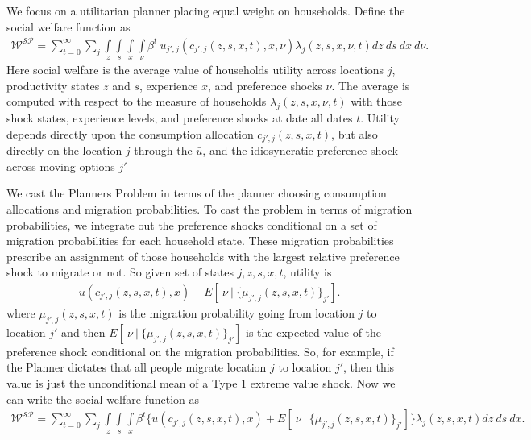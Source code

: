 \documentclass[12pt,pdftex]{article}
\begin{document}
\begin{onehalfspacing}
We focus on a utilitarian planner placing equal weight on households. Define the social welfare function as
\begin{align}
\mathcal{W^{SP}} = \sum_{t=0}^{\infty}\sum_{j} \int\limits_{z} \int\limits_{s} \int\limits_{x} \int\limits_{\nu} \beta^{t} \ u_{j',j}(c_{j',j}(z, s, x, t), x, \nu) \lambda_{j}(z, s, x, \nu, t) dz \ ds \ dx \ d\nu.
\label{eq:sp-social_welfare}
\end{align}
Here social welfare is the average value of households utility across locations $j$, productivity states $z$ and $s$, experience $x$, and preference shocks $\nu$. The average is computed with respect to the measure of households $\lambda_{j}(z, s, x, \nu, t)$ with those shock states, experience levels, and preference shocks at date all dates $t$. Utility depends directly upon the consumption allocation $c_{j',j}(z, s, x, t)$, but also  directly on the location $j$ through the $\bar u$, and the idiosyncratic preference shock across moving options $j'$

We cast the Planners Problem in terms of the planner choosing consumption allocations and migration probabilities. To cast the problem in terms of migration probabilities, we integrate out the preference shocks conditional on a set of migration probabilities for each household state. These migration probabilities prescribe an assignment of those households with the largest relative preference shock to migrate or not. So given set of states $j, z, s, x, t$, utility is
\begin{align}
u(c_{j',j}(z,s, x, t), x) + E[ \ \nu \ | \ \big\{\mu_{j',j}(z,s,x,t)\big\}_{j'} ].
\label{eq:utility-shocks}
\end{align}
where $\mu_{j',j}(z,s,x,t)$ is the migration probability going from location $j$ to location $j'$ and then $E[ \ \nu \ | \ \big\{\mu_{j',j}(z,s,x,t)\big\}_{j'} ]$ is the expected value of the preference shock conditional on the migration probabilities. So, for example, if the Planner dictates that all people migrate location $j$ to location $j'$, then this value is just the unconditional mean of a Type 1 extreme value shock. Now we can write the social welfare function as
\begin{align}
\mathcal{W^{SP}} = \sum_{t=0}^{\infty}\sum_{j} \int\limits_{z} \int\limits_{s} \int\limits_{x} \beta^{t} \bigg \{ u(c_{j',j}(z, s, x, t), x) + E[ \ \nu \ | \ \big\{\mu_{j',j}(z, s,x,t)\big\}_{j'}] \bigg \} \lambda_{j}(z, s, x, t) dz \ ds \ dx.
\label{eq:sp-social_welfare2}
\end{align}


\end{onehalfspacing}
\end{document}
